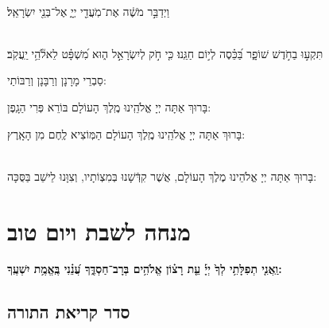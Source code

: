 \documentclass[twoside, openany, parskip=half, 11pt]{book}
\begin{document}
\\
וַיְדַבֵּ֣ר מֹשֶׁ֔ה אֶת־מֹֽעֲדֵ֖י יְיָ֑ אֶל־בְּנֵ֖י יִשְׂרָאֵֽל׃


\\
תִּקְע֣וּ בַחֹ֣דֶשׁ שׁוֹפָ֑ר בַּ֝כֵּ֗סֶה לְי֣וֹם חַגֵּֽנוּ׃ כִּ֤י חֹ֣ק לְיִשְׂרָאֵ֣ל ה֑וּא מִ֝שְׁפָּ֗ט לֵאלֹ֘הֵ֥י יַֽעֲקֹֽב׃

\begin{scriptsize}
סַבְרֵי מָרָנָן וְרַבָּנָן וְרַבּוֹתַי: 

\end{scriptsize}
בָּרוּךְ אַתָּה יְיָ אֱלֹהֵֽינוּ מֶֽלֶךְ הָעוֹלָם בּוֹרֵא פְּרִי הַגָֽפֶן:


בָּרוּךְ אַתָּה יְיָ אֱלֹהֵֽינוּ מֶֽלֶךְ הָעוֹלָם הַמּֽוֹצִיא לֶֽחֶם מִן הָאָֽרֶץ:

\begin{sometimes}

\\
בָּרוּךְ אַתָּה יְיָ אֱלֹהֵינוּ מֶלֶךְ הָעוֹלָם, אֲשֶׁר קִדְּֿשָׁנוּ בְּמִצְוֹתָיו, וְצִוָּנוּ לֵישֵׁב בַּסֻּכָּה:

\end{sometimes}

\chapter[מנחה לשבת ויום טוב]{ מנחה לשבת ויום טוב }

\ashrei

\uvaletzion

\halfkaddish

 \pageref{tefilasregel}

\textbf{וַֽאֲנִ֤י תְפִלָּתִ֥י לְךָ֙ יְיָ֡ עֵ֤ת רָצ֗וֹן אֱלֹהִ֥ים בְּרָב־חַסְדֶּ֑ךָ עֲ֝נֵ֗נִי בֶּֽאֱמֶ֥ת יִשְׁעֶֽךָ:} 


\section[סדר קריאת התורה]{ סדר קריאת התורה }


\pesicha

\gadlu

\avharachamim

\vesigale

 \pageref{torah}

\torahbarachu

\hagomel
\end{document}

